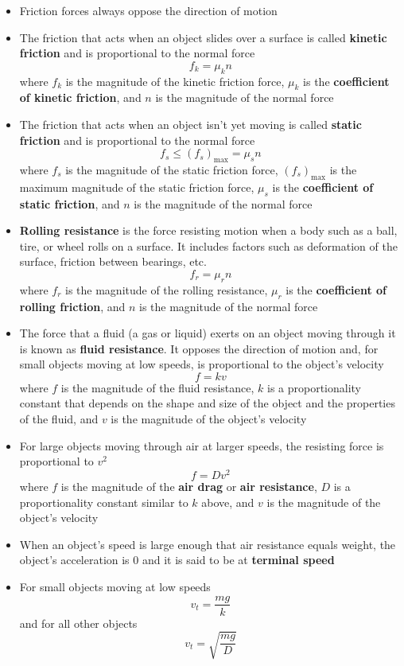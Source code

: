 \documentclass{article}
\begin{document}
\begin{itemize}
    \item Friction forces always oppose the direction of motion

    \item The friction that acts when an object slides over a surface is called \textbf{kinetic friction} and is proportional to the normal force \[f_k=\mu_k n\] where $f_k$ is the magnitude of the kinetic friction force, $\mu_k$ is the \textbf{coefficient of kinetic friction}, and $n$ is the magnitude of the normal force

    \item The friction that acts when an object isn't yet moving is called \textbf{static friction} and is proportional to the normal force \[f_s\le\left(f_s\right)_\textrm{max}=\mu_s n\] where $f_s$ is the magnitude of the static friction force, $\left(f_s\right)_\textrm{max}$ is the maximum magnitude of the static friction force, $\mu_s$ is the \textbf{coefficient of static friction}, and $n$ is the magnitude of the normal force

    \item \textbf{Rolling resistance} is the force resisting motion when a body such as a ball, tire, or wheel rolls on a surface. It includes factors such as deformation of the surface, friction between bearings, etc. \[f_r=\mu_r n\] where $f_r$ is the magnitude of the rolling resistance, $\mu_r$ is the \textbf{coefficient of rolling friction}, and $n$ is the magnitude of the normal force

    \item The force that a fluid (a gas or liquid) exerts on an object moving through it is known as \textbf{fluid resistance}. It opposes the direction of motion and, for small objects moving at low speeds, is proportional to the object's velocity \[f=kv\] where $f$ is the magnitude of the fluid resistance, $k$ is a proportionality constant that depends on the shape and size of the object and the properties of the fluid, and $v$ is the magnitude of the object's velocity

    \item For large objects moving through air at larger speeds, the resisting force is proportional to $v^2$ \[f=Dv^2\] where $f$ is the magnitude of the \textbf{air drag} or \textbf{air resistance}, $D$ is a proportionality constant similar to $k$ above, and $v$ is the magnitude of the object's velocity

    \item When an object's speed is large enough that air resistance equals weight, the object's acceleration is 0 and it is said to be at \textbf{terminal speed}

    \item For small objects moving at low speeds \[v_t=\frac{mg}{k}\] and for all other objects \[v_t=\sqrt{\frac{mg}{D}}\]
\end{itemize}
\end{document}
